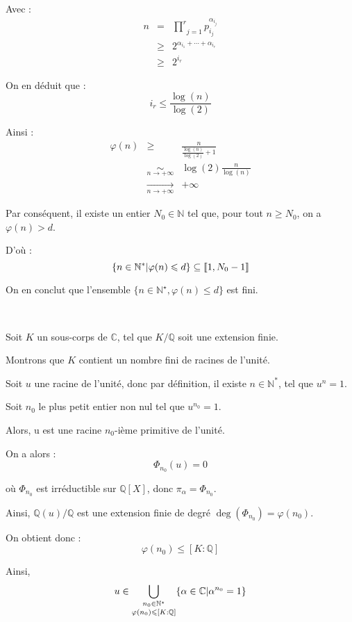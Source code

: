 Avec :
\begin{eqnarray*}
  n & = & \underset{j = 1}{\overset{r}{\prod}} p^{\alpha_{i_j}}_{i_j}\\
  & \geqslant & 2^{\alpha_{i_1} + \cdots + \alpha_{i_r}}\\
  & \geqslant & 2^{i_r}
\end{eqnarray*}


On en d{\'e}duit que :
\[ i_r \leqslant \frac{\log (n)}{\log (2)} \]


Ainsi :
\begin{eqnarray*}
  \varphi (n) & \geqslant & \frac{n}{\frac{\log (n)}{\log (2)} + 1}\\
  & \underset{n \rightarrow + \infty}{\sim} & \log (2) \frac{n}{\log (n)}\\
  & \underset{n \rightarrow + \infty}{\rightarrow} & + \infty
\end{eqnarray*}


Par cons{\'e}quent, il existe un entier $N_0 \in \mathbb{N}$ tel que, pour
tout $n \geqslant N_0$, on a $\varphi (n) > d$.

D'o{\`u} :
\[ \{ n \in \mathbb{N}^{\ast}  |  \varphi (n) \leqslant d \}
   \subseteq \llbracket 1, N_0 - 1 \rrbracket \]


On en conclut que l'ensemble $\{ n \in \mathbb{N}^{\star}, \varphi (n)
\leqslant d \}$ est fini.

\

 Soit $K$ un sous-corps de $\mathbb{C}$, tel que $K
/\mathbb{Q}$ soit une extension finie.

Montrons que $K$ contient un nombre fini de racines de l'unit{\'e}.

Soit $u$ une racine de l'unit{\'e}, donc par d{\'e}finition, il existe $n \in
\mathbb{N}^{\ast}$, tel que $u^n = 1$.

Soit $n_0$ le plus petit entier non nul tel que $u^{n_0} = 1$.

Alors, u est une racine $n_0$-i{\`e}me primitive de l'unit{\'e}.

On a alors :
\[ \Phi_{n_0} (u) = 0 \]


o{\`u} $\Phi_{n_0}$ est irr{\'e}ductible sur $\mathbb{Q} [X]$, donc
$\pi_{\alpha} = \Phi_{n_0}$.

Ainsi, $\mathbb{Q} (u) /\mathbb{Q}$ est une extension finie de degr{\'e} $\deg
(\Phi_{n_0}) = \varphi (n_0)$.

On obtient donc :
\[ \varphi (n_0) \leqslant [K : \mathbb{Q}] \]


Ainsi,
\[ u \in \underset{\varphi (n_0) \leqslant [K : \mathbb{Q}]}{\underset{n_0 \in
   \mathbb{N}^{\star}}{\bigcup}} \{ \alpha \in \mathbb{C} | 
   \alpha^{n_0} = 1 \} \]


